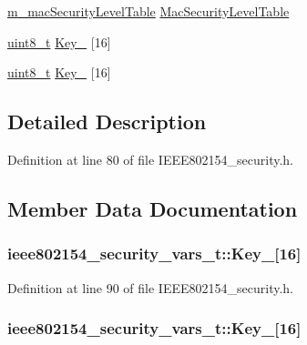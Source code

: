 \begin{DoxyCompactItemize}
\item 
\hyperlink{structm__mac_security_level_table}{m\+\_\+mac\+Security\+Level\+Table} \hyperlink{structieee802154__security__vars__t_ad5ce651d0ae075cb6551bf9f56c93937}{Mac\+Security\+Level\+Table}
\item 
\hyperlink{_p_e___types_8h_aba7bc1797add20fe3efdf37ced1182c5}{uint8\+\_\+t} \hyperlink{structieee802154__security__vars__t_ac395a09cf8bb12b7bd57f9dff17e2889}{Key\+\_} \mbox{[}16\mbox{]}
\item 
\hyperlink{_p_e___types_8h_aba7bc1797add20fe3efdf37ced1182c5}{uint8\+\_\+t} \hyperlink{structieee802154__security__vars__t_a04135e7c3c40d30626d3206bb7e31aec}{Key\+\_} \mbox{[}16\mbox{]}
\end{DoxyCompactItemize}


\subsection{Detailed Description}


Definition at line 80 of file I\+E\+E\+E802154\+\_\+security.\+h.



\subsection{Member Data Documentation}
\subsubsection[{\texorpdfstring{Key\+\_\+1}{Key_1}}]{ ieee802154\+\_\+security\+\_\+vars\+\_\+t\+::\+Key\+\_\mbox{[}16\mbox{]}}\hypertarget{structieee802154__security__vars__t_ac395a09cf8bb12b7bd57f9dff17e2889}{}\label{structieee802154__security__vars__t_ac395a09cf8bb12b7bd57f9dff17e2889}


Definition at line 90 of file I\+E\+E\+E802154\+\_\+security.\+h.

\subsubsection[{\texorpdfstring{Key\+\_\+2}{Key_2}}]{ ieee802154\+\_\+security\+\_\+vars\+\_\+t\+::\+Key\+\_\mbox{[}16\mbox{]}}\hypertarget{structieee802154__security__vars__t_a04135e7c3c40d30626d3206bb7e31aec}{}\label{structieee802154__security__vars__t_a04135e7c3c40d30626d3206bb7e31aec}


